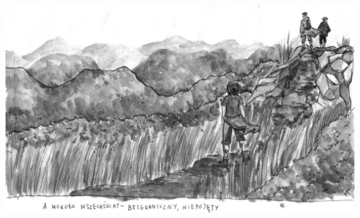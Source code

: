 \documentclass[a5paper, 10pt]{book}
\begin{document}
\\
\includegraphics[width=\textwidth,center]{images/czlowiek_jam_niewdzieczny.png}\\

\newpage
\end{document}
